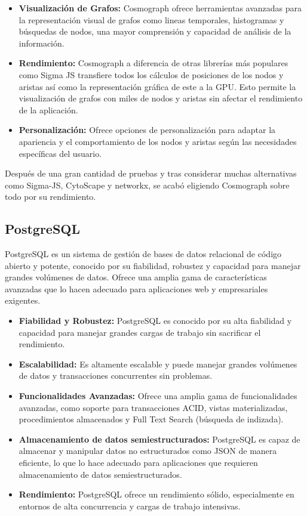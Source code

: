 \begin{itemize}
	\item \textbf{Visualización de Grafos:} Cosmograph ofrece herramientas avanzadas para la representación visual de grafos como lineas temporales, histogramas y búsquedas de nodos, una mayor comprensión y capacidad de análisis de la información.

	\item \textbf{Rendimiento:} Cosmograph a diferencia de otras librerías más populares como Sigma JS transfiere todos los cálculos de posiciones de los nodos y aristas así como la representación gráfica de este a la GPU. Esto permite la visualización de grafos con miles de nodos y aristas sin afectar el rendimiento de la aplicación.

	\item \textbf{Personalización:} Ofrece opciones de personalización para adaptar la apariencia y el comportamiento de los nodos y aristas según las necesidades específicas del usuario.

\end{itemize}

Después de una gran cantidad de pruebas y tras considerar muchas alternativas como Sigma-JS, CytoScape y networkx, se acabó eligiendo Cosmograph sobre todo por su rendimiento.

\subsection{PostgreSQL}

PostgreSQL es un sistema de gestión de bases de datos relacional de código abierto y potente, conocido por su fiabilidad, robustez y capacidad para manejar grandes volúmenes de datos. Ofrece una amplia gama de características avanzadas que lo hacen adecuado para aplicaciones web y empresariales exigentes.

\begin{itemize}
	\item \textbf{Fiabilidad y Robustez:} PostgreSQL es conocido por su alta fiabilidad y capacidad para manejar grandes cargas de trabajo sin sacrificar el rendimiento.
	\item \textbf{Escalabilidad:} Es altamente escalable y puede manejar grandes volúmenes de datos y transacciones concurrentes sin problemas.
	\item \textbf{Funcionalidades Avanzadas:} Ofrece una amplia gama de funcionalidades avanzadas, como soporte para transacciones ACID, vistas materializadas, procedimientos almacenados y Full Text Search (búsqueda de indizada).
	\item \textbf{Almacenamiento de datos semiestructurados:} PostgreSQL es capaz de almacenar y manipular datos no estructurados como JSON de manera eficiente, lo que lo hace adecuado para aplicaciones que requieren almacenamiento de datos semiestructurados.
	\item \textbf{Rendimiento:} PostgreSQL ofrece un rendimiento sólido, especialmente en entornos de alta concurrencia y cargas de trabajo intensivas.
\end{itemize}

